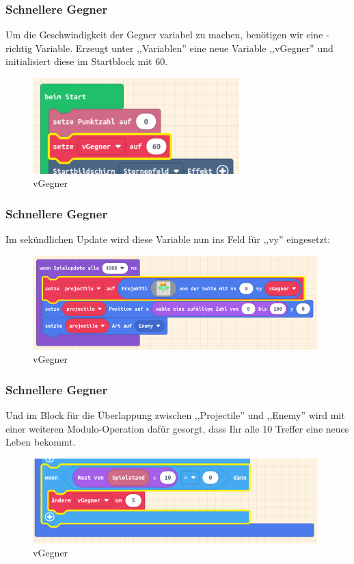 \documentclass{beamer}
\begin{document}
\begin{frame}
 \frametitle{Schnellere Gegner}
Um die Geschwindigkeit der Gegner variabel zu machen, benötigen wir eine - richtig Variable. Erzeugt unter ,,Variablen'' eine neue Variable ,,vGegner'' und initialisiert diese im Startblock mit 60.
 
 \begin{figure}
  \includegraphics[width=8cm]{game12.png}
  \caption{vGegner}
  \label{fig:game4}
\end{figure}
\end{frame}

\begin{frame}
 \frametitle{Schnellere Gegner}
Im sekündlichen Update wird diese Variable nun ins Feld für ,,vy'' eingesetzt:
 
 \begin{figure}
  \includegraphics[width=11cm]{game13.png}
  \caption{vGegner}
  \label{fig:game4}
\end{figure}
\end{frame}

\begin{frame}
 \frametitle{Schnellere Gegner}
Und im Block für die Überlappung zwischen ,,Projectile'' und ,,Enemy'' wird mit einer weiteren Modulo-Operation dafür gesorgt, dass Ihr alle 10 Treffer eine neues Leben bekommt. 
 
 \begin{figure}
  \includegraphics[width=11cm]{game14.png}
  \caption{vGegner}
  \label{fig:game4}
\end{figure}
\end{frame}
\end{document}

